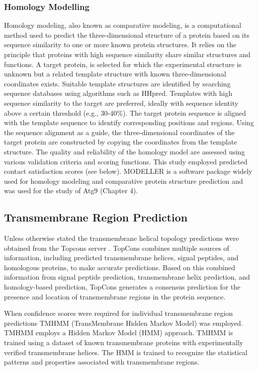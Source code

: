 \subsubsection{Homology Modelling}
Homology modeling, also known as comparative modeling, is a computational method used to predict the three-dimensional structure of a protein based on its sequence similarity to one or more known protein structures. It relies on the principle that proteins with high sequence similarity share similar structures and functions. A target protein, is selected for which the experimental structure is unknown but a related template structure with known three-dimensional coordinates exists. Suitable template structures are identified by searching sequence databases using algorithms such as HHpred. Templates with high sequence similarity to the target are preferred, ideally with sequence identity above a certain threshold (e.g., 30-40\%). The target protein sequence is aligned with the template sequence to identify corresponding positions and regions. Using the sequence alignment as a guide, the three-dimensional coordinates of the target protein are constructed by copying the coordinates from the template structure. The quality and reliability of the homology model are assessed using various validation criteria and scoring functions. This study employed predicted contact satisfaction scores (see below). MODELLER \cite{eswar2006comparative} is a software package widely used for homology modeling and comparative protein structure prediction and was used for the study of Atg9 (Chapter 4). 

\subsection{Transmembrane Region Prediction}
Unless otherwise stated the transmembrane helical topology predictions were obtained from the Topcons server \cite{Tsirigos2015}. TopCons combines multiple sources of information, including predicted transmembrane helices, signal peptides, and homologous proteins, to make accurate predictions.  Based on this combined information from signal peptide prediction, transmembrane helix prediction, and homology-based prediction, TopCons generates a consensus prediction for the presence and location of transmembrane regions in the protein sequence.

When confidence scores were required for individual transmembrane region predictions TMHMM (TransMembrane Hidden Markov Model) was employed. TMHMM employs a Hidden Markov Model (HMM) approach.  TMHMM is trained using a dataset of known transmembrane proteins with experimentally verified transmembrane helices. The HMM is trained to recognize the statistical patterns and properties associated with transmembrane regions.

